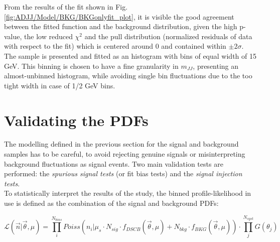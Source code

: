 \noindent From the results of the fit shown in Fig. \ref{fig:ADJJ/Model/BKG/BKGonlyfit_plot}, it is visible the good agreement between the fitted function and the background distribution, given the high p-value, the low reduced $\chi^2$ and the pull distribution (normalized residuals of data with respect to the fit) which is centered around 0 and contained within $\pm 2 \sigma$.\\
The sample is presented and fitted as an histogram with bins of equal width of 15 GeV.
This binning is chosen to have a fine granularity in $m_{JJ}$, presenting an almost-unbinned histogram, while avoiding single bin fluctuations due to the too tight width in case of 1/2 GeV bins.\\


\section{Validating the PDFs}\label{sec:ADJJ/Validation}

The modelling defined in the previous section for the signal and background samples has to be careful, to avoid rejecting genuine signals or misinterpreting background fluctuations as signal events.
Two main validation tests are performed: the \textit{spurious signal tests} (or fit bias tests) and the \textit{signal injection tests}.\\
To statistically interpret the results of the study, the binned profile-likelihood in use is defined as the combination of the signal and background PDFs:


\begin{equation}\label{eq:ADJJ/Validation/likelihood}
  \mathcal{L}(\vec{n}|\vec{\theta},\mu) = \prod_{i}^{N_{bins}} Poiss(n_i | \mu_s\cdot N_{sig}  \cdot f_{DSCB}(\vec{\theta},\mu) + N_{bkg} \cdot f_{BKG}(\vec{\theta},\mu)) \cdot \prod_{j}^{N_{syst}} G(\theta_j)
\end{equation}


